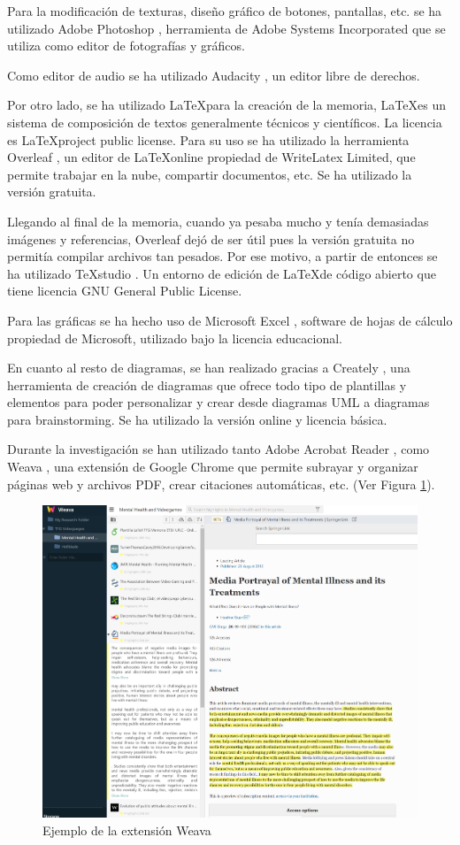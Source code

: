 \documentclass[12pt, a4paper,twoside,titlepage]{book}
\begin{document}
Para la modificación de texturas, diseño gráfico de botones, pantallas, etc. se ha utilizado Adobe Photoshop \cite{photoshop}, herramienta de Adobe Systems Incorporated que se utiliza como editor de fotografías y gráficos. 

Como editor de audio se ha utilizado Audacity \cite{audacity}, un editor libre de derechos. 

Por otro lado, se ha utilizado \LaTeX para la creación de la memoria, \LaTeX es un sistema de composición de textos generalmente técnicos y científicos. La licencia es \LaTeX project public license. Para su uso se ha utilizado la herramienta Overleaf \cite{overleaf}, un editor de \LaTeX online propiedad de WriteLatex Limited, que permite trabajar en la nube, compartir documentos, etc. Se ha utilizado la versión gratuita. 

Llegando al final de la memoria, cuando ya pesaba mucho y tenía demasiadas imágenes y referencias, Overleaf dejó de ser útil pues la versión gratuita no permitía compilar archivos tan pesados. Por ese motivo, a partir de entonces se ha utilizado TeXstudio \cite{texstudio}. Un entorno de edición de \LaTeX de código abierto que tiene licencia GNU General Public License. 

Para las gráficas se ha hecho uso de Microsoft Excel \cite{excel}, software de hojas de cálculo propiedad de Microsoft, utilizado bajo la licencia educacional. 

En cuanto al resto de diagramas, se han realizado gracias a Creately \cite{creately}, una herramienta de creación de diagramas que ofrece todo tipo de plantillas y elementos para poder personalizar y crear desde diagramas UML a diagramas para brainstorming. Se ha utilizado la versión online y licencia básica. 

Durante la investigación se han utilizado tanto Adobe Acrobat Reader \cite{adobeacrobat}, como Weava \cite{weava}, una extensión de Google Chrome que permite subrayar y organizar páginas web y archivos PDF, crear citaciones automáticas, etc. (Ver Figura \ref{fig:weava}). 

\begin{figure}
    \centering
    \includegraphics[width=.8\linewidth]{TGF/Extra/Weava.png}
    \caption{Ejemplo de la extensión Weava}
    \label{fig:weava}
\end{figure}
\end{document}
